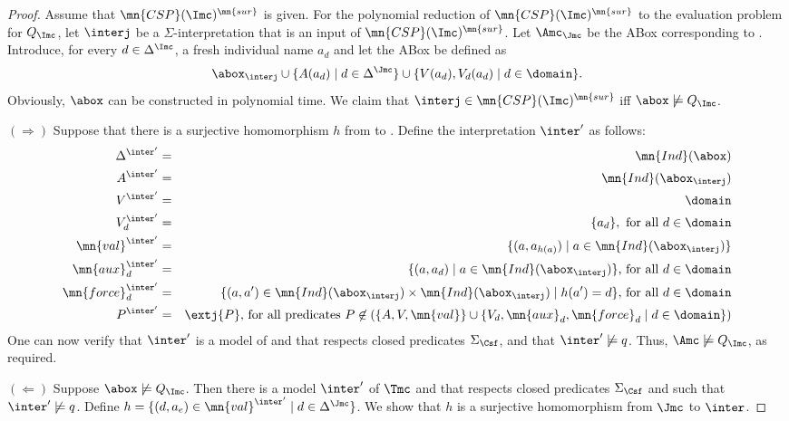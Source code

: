 \documentclass{lmcs}
\theoremstyle{definition}
\begin{document}
\begin{proof}
  Assume that $\mn{CSP}(\Imc)^{\mn{sur}}$ is given.
  For the polynomial reduction of $\mn{CSP}(\Imc)^{\mn{sur}}$ to the evaluation problem for $Q_{\Imc}$, 
  let $\interj$ be a $\Sigma$-interpretation that is an input of
  $\mn{CSP}(\Imc)^{\mn{sur}}$. Let $\Amc_\Jmc$ be the ABox corresponding to \Jmc. Introduce, for every $d\in \Delta^{\Imc}$, a fresh individual name $a_{d}$ and let
  the ABox \Amc be defined as
  \[\abox_\interj\cup\{A(a_d)\mid
  d\in\Delta^\Jmc\}\cup\{V(a_d),V_d(a_d)\mid d\in\domain\}.\]
  Obviously, $\abox$ can be constructed in polynomial time. We claim
  that $\interj\in\mn{CSP}(\Imc)^{\mn{sur}}$ iff $\abox\not\models
  Q_{\Imc}$.

  \smallskip
  
  $(\Rightarrow)$ Suppose that there is a surjective homomorphism $h$
  from \Jmc to \Imc. Define the interpretation $\inter'$ as follows:
  \begin{eqnarray*}
    \Delta^{\inter'} & = & \mn{Ind}(\abox)\\
    A^{\inter'} & = & \mn{Ind}(\abox_\interj)\\
    V^{\inter'} & = & \domain\\
    V_d^{\inter'} & = & \{a_d\},\text{ for all }d\in\domain\\
    \mn{val}^{\inter'}  & = & \{(a,a_{h(a)})\mid a\in\mn{Ind}(\abox_\interj)\}\\ 
    \mn{aux}_d^{\inter'} & = & \{(a,a_d)\mid a\in\mn{Ind}(\abox_\interj)\}\text{, for all }d\in\domain \\
    \mn{force}_d^{\inter'} & = & \{(a,a')\in\mn{Ind}(\abox_\interj)\times\mn{Ind}(\abox_\interj)\mid h(a')=d\}\text{, for all }d\in\domain\\
    P^{\inter'} & = & \extj{P}\text{, for all predicates }P \not\in(\{A,V,\mn{val}\}\cup\{V_d,\mn{aux}_d,\mn{force}_d\mid d\in\domain\})
  \end{eqnarray*}
  One can now verify that $\inter'$ is a model of \Tmc and \Amc that
  respects closed predicates $\Sigma_{\Csf}$, and that
  $\inter'\not\models q$. Thus, $\Amc\not\models Q_{\Imc}$, as required.

  \smallskip
  
  $(\Leftarrow)$ Suppose $\abox\not\models Q_{\Imc}$. Then there is a model 
  $\inter'$ of $\Tmc$ and \Amc that respects closed predicates 
  $\Sigma_\Csf$ and such that $\inter'\not\models q$. Define 
  $h=\{(d,a_e)\in\mn{val}^{\inter'}\mid d\in \Delta^\Jmc \}$. We show 
  that $h$ is a surjective homomorphism from $\Jmc$ to $\inter$.


\end{proof}
\end{document}
